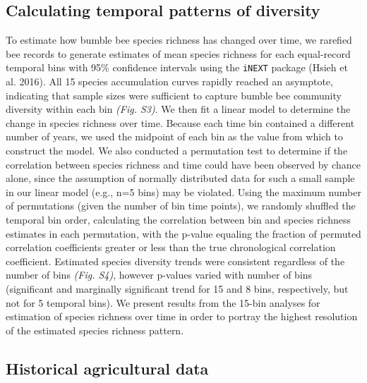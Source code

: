 \documentclass[11pt,]{article}
\begin{document}
\hypertarget{calculating-temporal-patterns-of-diversity}{%
\subsection{Calculating temporal patterns of
diversity}\label{calculating-temporal-patterns-of-diversity}}

To estimate how bumble bee species richness has changed over time, we
rarefied bee records to generate estimates of mean species richness for
each equal-record temporal bins with 95\% confidence intervals using the
\texttt{iNEXT} package (Hsieh et al. 2016). All 15 species accumulation
curves rapidly reached an asymptote, indicating that sample sizes were
sufficient to capture bumble bee community diversity within each bin
\emph{(Fig. S3)}. We then fit a linear model to determine the change in
species richness over time. Because each time bin contained a different
number of years, we used the midpoint of each bin as the value from
which to construct the model. We also conducted a permutation test to
determine if the correlation between species richness and time could
have been observed by chance alone, since the assumption of normally
distributed data for such a small sample in our linear model (e.g., n=5
bins) may be violated. Using the maximum number of permutations (given
the number of bin time points), we randomly shuffled the temporal bin
order, calculating the correlation between bin and species richness
estimates in each permutation, with the p-value equaling the fraction of
permuted correlation coefficients greater or less than the true
chronological correlation coefficient. Estimated species diversity
trends were consistent regardless of the number of bins \emph{(Fig.
S4)}, however p-values varied with number of bins (significant and
marginally significant trend for 15 and 8 bins, respectively, but not
for 5 temporal bins). We present results from the 15-bin analyses for
estimation of species richness over time in order to portray the highest
resolution of the estimated species richness pattern.

\hypertarget{historical-agricultural-data}{%
\subsection{Historical agricultural
data}\label{historical-agricultural-data}}
\end{document}
